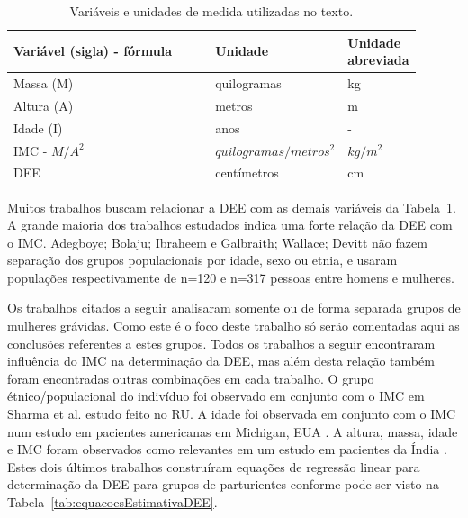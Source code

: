 \begin{table}[!ht]
\begin{center}
\caption{Variáveis e unidades de medida utilizadas no texto.}
\label{tab:variaveisUnidades}
\begin{tabular}{|p{0.52\linewidth}|p{0.25\linewidth}|p{0.13\linewidth}|}
\hline
\textbf{Variável (sigla) - fórmula} & \textbf{Unidade} & \textbf{Unidade abreviada}\\
\hline\hline
Massa (M) & quilogramas & kg \\
Altura (A) & metros & m \\
Idade (I) & anos & - \\
\acrfull{IMC} - $M/A^2$ & $quilogramas/metros^2$ & $kg/m^2$ \\
\acrfull{DEE} & centímetros & cm \\
\hline
\end{tabular}
\end{center}
\end{table}

Muitos trabalhos buscam relacionar a \acrfull{DEE} com as demais variáveis da Tabela~\ref{tab:variaveisUnidades}. A grande maioria dos trabalhos estudados indica uma forte relação da \acrshort{DEE} com o \acrshort{IMC}. Adegboye; Bolaju; Ibraheem \cite{Adegboye2017} e Galbraith; Wallace; Devitt \cite{Galbraith2018} não fazem separação dos grupos populacionais por idade, sexo ou etnia, e usaram populações respectivamente de n=120 e n=317 pessoas entre homens e mulheres.

Os trabalhos citados a seguir analisaram somente ou de forma separada grupos de mulheres grávidas. Como este é o foco deste trabalho só serão comentadas aqui as conclusões referentes a estes grupos. Todos os trabalhos a seguir encontraram influência do \acrshort{IMC} na determinação da \acrshort{DEE}, mas além desta relação também foram encontradas outras combinações em cada trabalho. O grupo étnico/populacional do indivíduo foi observado em conjunto com o \acrshort{IMC} em Sharma et al. \cite{Sharma2011} estudo feito no \acrfull{RU}. A idade foi observada em conjunto com o \acrshort{IMC} num estudo em pacientes americanas em Michigan, EUA \cite{Clinkscales2007}. A altura, massa, idade e \acrshort{IMC} foram observados como relevantes em um estudo em pacientes da Índia \cite{Hazarika2016}. Estes dois últimos trabalhos construíram equações de regressão linear para determinação da \acrshort{DEE} para grupos de parturientes conforme pode ser visto na Tabela~\ref{tab:equacoesEstimativaDEE}.

